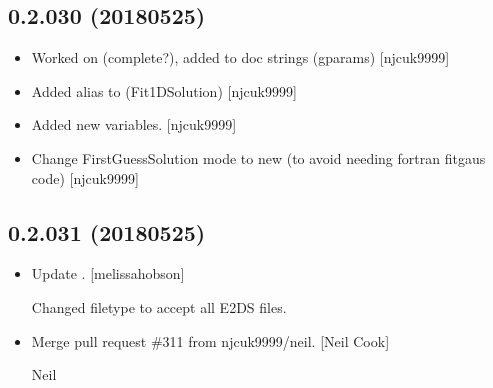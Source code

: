 \documentclass[a4paper,10pt,english]{report}
\begin{document}
\subsection{0.2.030 (2018\sphinxhyphen{}05\sphinxhyphen{}25)}
\label{\detokenize{misc/changelog:id450}}\begin{itemize}
\item {} 
Worked on  (complete?), added to doc strings (gparams)
{[}njcuk9999{]}

\item {} 
Added alias to  (Fit1DSolution) {[}njcuk9999{]}

\item {} 
Added new  variables. {[}njcuk9999{]}

\item {} 
Change FirstGuessSolution mode to new (to avoid needing fortran
fitgaus code) {[}njcuk9999{]}

\end{itemize}


\subsection{0.2.031 (2018\sphinxhyphen{}05\sphinxhyphen{}25)}
\label{\detokenize{misc/changelog:id451}}\begin{itemize}
\item {} 
Update . {[}melissa\sphinxhyphen{}hobson{]}

Changed filetype to accept all E2DS files.

\item {} 
Merge pull request \#311 from njcuk9999/neil. {[}Neil Cook{]}

Neil

\end{itemize}
\end{document}
